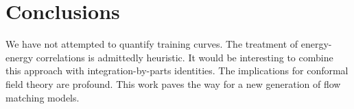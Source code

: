 \section{Conclusions}\label{sec:conclusions}

We have not attempted to quantify training curves. The treatment of
energy-energy correlations is admittedly heuristic. It would be
interesting to combine this approach with integration-by-parts
identities. The implications for conformal field theory are profound.
This work paves the way for a new generation of flow matching models.

